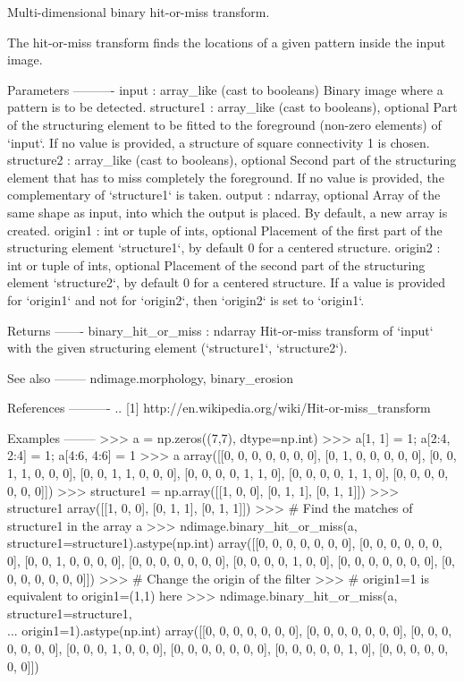 \begin{DoxyVerb}Multi-dimensional binary hit-or-miss transform.

The hit-or-miss transform finds the locations of a given pattern
inside the input image.

Parameters
----------
input : array_like (cast to booleans)
    Binary image where a pattern is to be detected.
structure1 : array_like (cast to booleans), optional
    Part of the structuring element to be fitted to the foreground
    (non-zero elements) of `input`. If no value is provided, a
    structure of square connectivity 1 is chosen.
structure2 : array_like (cast to booleans), optional
    Second part of the structuring element that has to miss completely
    the foreground. If no value is provided, the complementary of
    `structure1` is taken.
output : ndarray, optional
    Array of the same shape as input, into which the output is placed.
    By default, a new array is created.
origin1 : int or tuple of ints, optional
    Placement of the first part of the structuring element `structure1`,
    by default 0 for a centered structure.
origin2 : int or tuple of ints, optional
    Placement of the second part of the structuring element `structure2`,
    by default 0 for a centered structure. If a value is provided for
    `origin1` and not for `origin2`, then `origin2` is set to `origin1`.

Returns
-------
binary_hit_or_miss : ndarray
    Hit-or-miss transform of `input` with the given structuring
    element (`structure1`, `structure2`).

See also
--------
ndimage.morphology, binary_erosion

References
----------
.. [1] http://en.wikipedia.org/wiki/Hit-or-miss_transform

Examples
--------
>>> a = np.zeros((7,7), dtype=np.int)
>>> a[1, 1] = 1; a[2:4, 2:4] = 1; a[4:6, 4:6] = 1
>>> a
array([[0, 0, 0, 0, 0, 0, 0],
       [0, 1, 0, 0, 0, 0, 0],
       [0, 0, 1, 1, 0, 0, 0],
       [0, 0, 1, 1, 0, 0, 0],
       [0, 0, 0, 0, 1, 1, 0],
       [0, 0, 0, 0, 1, 1, 0],
       [0, 0, 0, 0, 0, 0, 0]])
>>> structure1 = np.array([[1, 0, 0], [0, 1, 1], [0, 1, 1]])
>>> structure1
array([[1, 0, 0],
       [0, 1, 1],
       [0, 1, 1]])
>>> # Find the matches of structure1 in the array a
>>> ndimage.binary_hit_or_miss(a, structure1=structure1).astype(np.int)
array([[0, 0, 0, 0, 0, 0, 0],
       [0, 0, 0, 0, 0, 0, 0],
       [0, 0, 1, 0, 0, 0, 0],
       [0, 0, 0, 0, 0, 0, 0],
       [0, 0, 0, 0, 1, 0, 0],
       [0, 0, 0, 0, 0, 0, 0],
       [0, 0, 0, 0, 0, 0, 0]])
>>> # Change the origin of the filter
>>> # origin1=1 is equivalent to origin1=(1,1) here
>>> ndimage.binary_hit_or_miss(a, structure1=structure1,\\
... origin1=1).astype(np.int)
array([[0, 0, 0, 0, 0, 0, 0],
       [0, 0, 0, 0, 0, 0, 0],
       [0, 0, 0, 0, 0, 0, 0],
       [0, 0, 0, 1, 0, 0, 0],
       [0, 0, 0, 0, 0, 0, 0],
       [0, 0, 0, 0, 0, 1, 0],
       [0, 0, 0, 0, 0, 0, 0]])\end{DoxyVerb}
